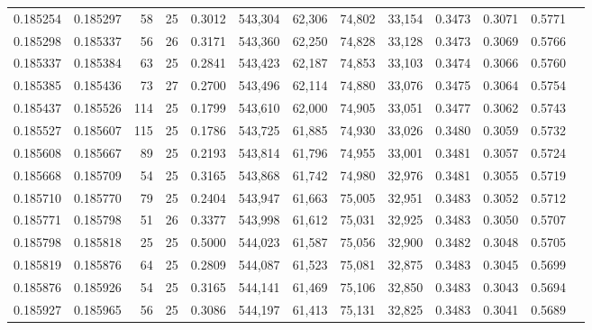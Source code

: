\begin{tabular}{rrrrrrrrrrrrr}
0.185254 & 0.185297 &    58 &  25 &                                     0.3012 & 543,304 &  62,306 &  74,802 &  33,154 & 0.3473 & 0.3071 & 0.5771 \\
0.185298 & 0.185337 &    56 &  26 &                                     0.3171 & 543,360 &  62,250 &  74,828 &  33,128 & 0.3473 & 0.3069 & 0.5766 \\
0.185337 & 0.185384 &    63 &  25 &                                     0.2841 & 543,423 &  62,187 &  74,853 &  33,103 & 0.3474 & 0.3066 & 0.5760 \\
0.185385 & 0.185436 &    73 &  27 &                                     0.2700 & 543,496 &  62,114 &  74,880 &  33,076 & 0.3475 & 0.3064 & 0.5754 \\
0.185437 & 0.185526 &   114 &  25 &                                     0.1799 & 543,610 &  62,000 &  74,905 &  33,051 & 0.3477 & 0.3062 & 0.5743 \\
0.185527 & 0.185607 &   115 &  25 &                                     0.1786 & 543,725 &  61,885 &  74,930 &  33,026 & 0.3480 & 0.3059 & 0.5732 \\
0.185608 & 0.185667 &    89 &  25 &                                     0.2193 & 543,814 &  61,796 &  74,955 &  33,001 & 0.3481 & 0.3057 & 0.5724 \\
0.185668 & 0.185709 &    54 &  25 &                                     0.3165 & 543,868 &  61,742 &  74,980 &  32,976 & 0.3481 & 0.3055 & 0.5719 \\
0.185710 & 0.185770 &    79 &  25 &                                     0.2404 & 543,947 &  61,663 &  75,005 &  32,951 & 0.3483 & 0.3052 & 0.5712 \\
0.185771 & 0.185798 &    51 &  26 &                                     0.3377 & 543,998 &  61,612 &  75,031 &  32,925 & 0.3483 & 0.3050 & 0.5707 \\
0.185798 & 0.185818 &    25 &  25 &                                     0.5000 & 544,023 &  61,587 &  75,056 &  32,900 & 0.3482 & 0.3048 & 0.5705 \\
0.185819 & 0.185876 &    64 &  25 &                                     0.2809 & 544,087 &  61,523 &  75,081 &  32,875 & 0.3483 & 0.3045 & 0.5699 \\
0.185876 & 0.185926 &    54 &  25 &                                     0.3165 & 544,141 &  61,469 &  75,106 &  32,850 & 0.3483 & 0.3043 & 0.5694 \\
0.185927 & 0.185965 &    56 &  25 &                                     0.3086 & 544,197 &  61,413 &  75,131 &  32,825 & 0.3483 & 0.3041 & 0.5689 \\

\end{tabular}
